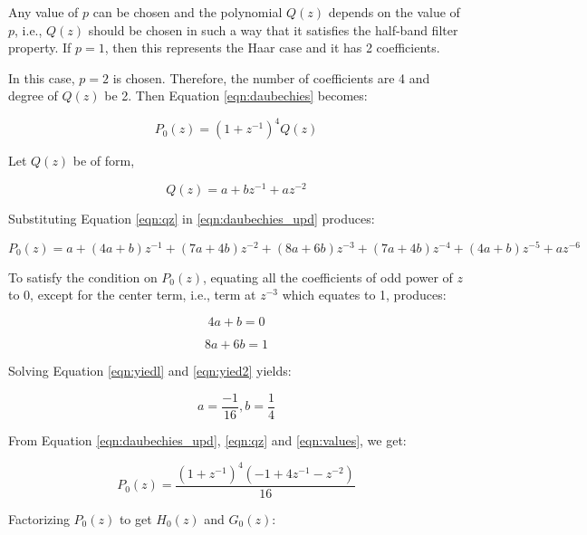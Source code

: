 Any value of $p$ can be chosen and the polynomial $Q(z)$ depends on the value of $p$, i.e., $Q(z)$ should be chosen in such a way that it satisfies the half-band filter property. If $p=1$, then this represents the Haar case and it has 2 coefficients.

In this case, $p=2$ is chosen. Therefore, the number of coefficients are 4 and degree of $Q(z)$ be 2. Then Equation \ref{eqn:daubechies} becomes:

\begin{equation}\label{eqn:daubechies_upd} 
{P_0(z) = (1 + z^{-1})^{4}Q(z)}
\end{equation}

Let $Q(z)$ be of form,

\begin{equation}\label{eqn:qz} 
{Q(z) = a+bz^{-1}+az^{-2}}
\end{equation}


Substituting Equation \ref{eqn:qz} in \ref{eqn:daubechies_upd} produces:

\begin{equation}\label{eqn:producer} 
{P_0(z) = a + (4a+b)z^{-1} + (7a + 4b)z^{-2} + (8a+6b)z^{-3} + (7a+4b)z^{-4} + (4a+b)z^{-5} + az^{-6}}
\end{equation}

To satisfy the condition on $P_0(z)$, equating all the coefficients of odd power of $z$ to 0, except for the center term, i.e., term at $z^{-3}$ which equates to 1, produces:

\begin{equation}\label{eqn:yiedl} 
{4a + b = 0}
\end{equation}


\begin{equation}\label{eqn:yied2} 
{8a + 6b = 1}
\end{equation}

Solving Equation \ref{eqn:yiedl} and \ref{eqn:yied2} yields:

\begin{equation}\label{eqn:values} 
{a = \frac{-1}{16}, b=\frac{1}{4}}
\end{equation}


From Equation \ref{eqn:daubechies_upd}, \ref{eqn:qz} and \ref{eqn:values}, we get:

\begin{equation} 
{P_0(z) = \frac{(1 + z^{-1})^4(-1 + 4z^{-1} - z^{-2})}{16}}
\end{equation}

Factorizing $P_0(z)$ to get $H_0(z)$ and $G_0(z)$:

